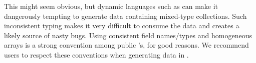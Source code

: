  This might seem obvious, but dynamic languages such as \R can make it dangerously tempting to generate data containing mixed-type collections. Such inconsistent typing makes it very difficult to consume the data and creates a likely source of nasty bugs. Using consistent field names/types and homogeneous \JSON arrays is a strong convention among public \JSON \API's, for good reasons. We recommend \R users to respect these conventions when generating \JSON data in \R.



 